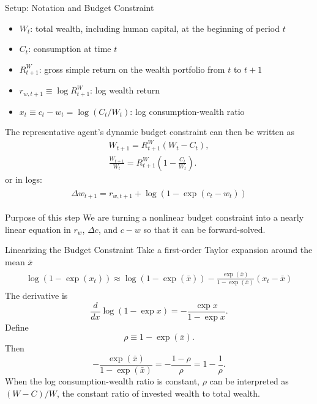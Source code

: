 \documentclass{beamer}
\begin{document}
\begin{frame}{Setup: Notation and Budget Constraint}
    \small
	\begin{itemize}
		\item $ W_t $: total wealth, including human capital, at the beginning of period $t$
		\item $ C_t $: consumption at time $t$
		\item $ R^W_{t+1} $: gross simple return on the wealth portfolio from $t$ to $t+1$
		\item $ r_{w,t+1}\equiv \log R^W_{t+1} $: log wealth return
		\item $x_t\equiv c_t-w_t=\log(C_t/W_t)$: log consumption-wealth ratio
	\end{itemize}
	The representative agent's dynamic budget constraint can then be written as
	\begin{align}
		W_{t+1}=R^W_{t+1}\left(W_{t}-C_{t}\right),\\
		\frac{W_{t+1}}{W_{t}}=R^W_{t+1}\left(1-\frac{C_{t}}{W_{t}}\right).
	\end{align}
	or in logs:
	\begin{align}
		\begin{aligned}
			\Delta w_{t+1}  =r_{w, t+1}+\log \left(1-\exp \left(c_{t}-w_{t}\right)\right)
		\end{aligned}
	\end{align}
    \begin{block}{Purpose of this step}
        We are turning a nonlinear budget constraint into a nearly linear equation in $r_w$, $\Delta c$, and $c-w$ so that it can be forward-solved.
    \end{block}
\end{frame}

\begin{frame}{Linearizing the Budget Constraint}
    \small
	Take a first-order Taylor expansion around the mean $ \bar{x} $
	\begin{align}
		\begin{array}{l}
			\log \left(1-\exp \left(x_{t}\right)\right) \approx \log (1-\exp (\bar{x}))
			-\frac{\exp (\bar{x})}{1-\exp (\bar{x})}\left(x_{t}-\bar{x}\right)
		\end{array}
	\end{align}
	The derivative is
    \begin{equation*}
        \frac{d}{dx}\log(1-\exp x)=-\frac{\exp x}{1-\exp x}.
    \end{equation*}
    Define
    \begin{equation*}
        \rho \equiv 1-\exp(\bar{x}).
    \end{equation*}
    Then
    \begin{equation*}
        -\frac{\exp(\bar{x})}{1-\exp(\bar{x})}
        =-\frac{1-\rho}{\rho}
        =1-\frac{1}{\rho}.
    \end{equation*}
	When the log consumption-wealth ratio is constant, $ \rho $ can be interpreted as $ (W-C)/W $, the constant ratio of invested wealth to total wealth.
\end{frame}
\end{document}
